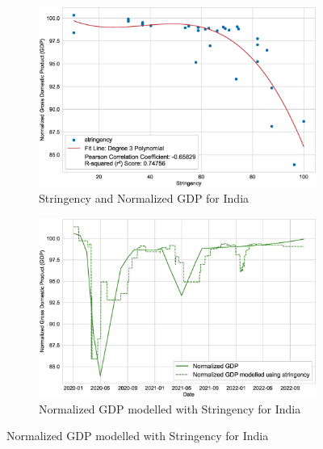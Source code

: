 \documentclass[tikz,fleqn,12pt]{wlscirep}
\begin{document}
\begin{figure}[H]
  \centering
  \caption{Stringency and GDP for Developing Economies}
  \begin{subfigure}[t]{0.48\textwidth}
    \centering
    \includegraphics[width=\linewidth]{images/stringency_vs_gdp_IND.eps}
    \caption{Stringency and Normalized GDP for India}
  \end{subfigure}
  \label{fig:stringency_vs_gdp_IND}
  \hfill
  \begin{subfigure}[t]{0.48\textwidth}
    \centering
    \includegraphics[width=\linewidth]{images/gdp_modelled_with_stringency_IND.eps}
    \caption{Normalized GDP modelled with Stringency for India}
  \end{subfigure}
  \label{fig:gdp_modelled_with_stringency_IND}


\end{figure}
\end{document}
